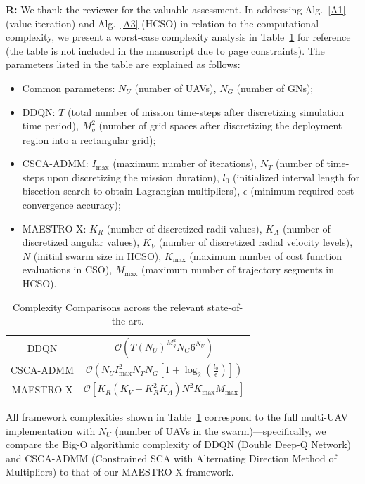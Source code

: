 \documentclass[12pt, draftcls, onecolumn]{IEEEtran}
\theoremstyle{plain}
\theoremstyle{definition}
\theoremstyle{remark}
\begin{document}
\begin{enumerate}
\textbf{R:} We thank the reviewer for the valuable assessment. In addressing Alg.~\ref{A1} (value iteration) and Alg.~\ref{A3} (HCSO) in relation to the computational complexity, we present a worst-case complexity analysis in Table~\ref{T2} for reference (the table is not included in the manuscript due to page constraints). The parameters listed in the table are explained as follows:
\begin{itemize}
    \item Common parameters: $N_U$ (number of UAVs), $N_G$ (number of GNs);
    \item DDQN: $T$ (total number of mission time-steps after discretizing simulation time period), $M_g^2$ (number of grid spaces after discretizing the deployment region into a rectangular grid);
    \item CSCA-ADMM: $I_{\max}$ (maximum number of iterations), $N_T$ (number of time-steps upon discretizing the mission duration), $l_0$ (initialized interval length for bisection search to obtain Lagrangian multipliers), $\epsilon$ (minimum required cost convergence accuracy);
    \item MAESTRO-X: $K_{R}$ (number of discretized radii values), $K_{A}$ (number of discretized angular values), $K_{V}$ (number of discretized radial velocity levels), $N$ (initial swarm size in HCSO), $K_{\max}$ (maximum number of cost function evaluations in CSO), $M_{\max}$ (maximum number of trajectory segments in HCSO).
\end{itemize}
\begin{table}
\begin{center}
\scriptsize
    \begin{tabular}{|*{2}{c|}}
    \hline
	\thead{\bf{Framework}} &
	\thead{\bf{Worst-Case Complexity}}\\
    \hline
    DDQN \cite{DDQN} & $\mathcal{O}\left(T \left(N_{U}\right)^{M_g^2}N_{G} 6^{N_{U}}\right)$\\
    \hline
    CSCA-ADMM \cite{CSCA-ADMM} & $\mathcal{O}\left(N_{U}I_{\mathrm{max}}^{2}N_{T}N_{G}\left[1{+}\log_{2}\left(\frac{l_{0}}{\epsilon}\right)\right] \right)$\\
    \hline
    MAESTRO-X & $\mathcal{O}\left[K_{R}\left(K_{V}{+}K_{R}^{2}K_{A}\right)N^{2}K_{\mathrm{max}}M_{\mathrm{max}}\right]$\\
    \hline
    \end{tabular}
    \vspace{-2mm}
    \caption{Complexity Comparisons across the relevant state-of-the-art.}\label{T2}
\end{center}
\end{table}
All framework complexities shown in Table~\ref{T2} correspond to the full multi-UAV implementation with $N_U$ (number of UAVs in the swarm)---specifically, we compare the Big-O algorithmic complexity of DDQN (Double Deep-Q Network) \cite{DDQN} and CSCA-ADMM (Constrained SCA with Alternating Direction Method of Multipliers) \cite{CSCA-ADMM} to that of our MAESTRO-X framework.
\vspace{2mm}


\end{enumerate}
\end{document}
